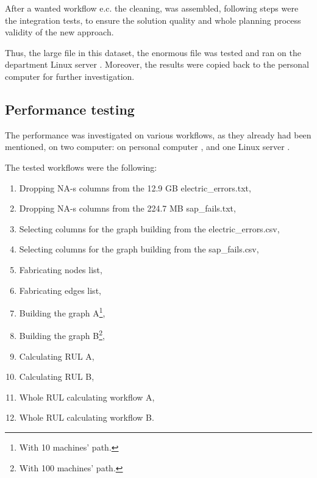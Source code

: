 After a wanted workflow e.c. the cleaning, was assembled, following steps were the integration tests, to ensure the solution quality and whole planning process validity of the new approach.

Thus, the large file in this dataset, the enormous file was tested and ran on the department Linux server \cite{Batman}.
Moreover, the results were copied back to the personal computer for further investigation.
\subsection{Performance testing}
The performance was investigated on various workflows, as they already had been mentioned, on two computer: on personal computer \cite{Latitude}, and one Linux server \cite{Batman}.

The tested workflows were the following:
\begin{enumerate}
	\item{Dropping NA-s columns from the 12.9 GB electric\_errors.txt,}
	\item{Dropping NA-s columns from the 224.7 MB sap\_fails.txt,}
	\item{Selecting columns for the graph building from the electric\_errors.csv,}
	\item{Selecting columns for the graph building from the sap\_fails.csv,}
	\item{Fabricating nodes list,}
	\item{Fabricating edges list,}
	\item{Building the graph A\footnote{With 10 machines' path.},}
	\item{Building the graph B\footnote{With 100 machines' path.},}
	\item{Calculating RUL A,}
	\item{Calculating RUL B,}
	\item{Whole RUL calculating workflow A,}
	\item{Whole RUL calculating workflow B.}
\end{enumerate} 

